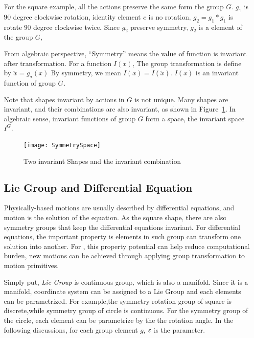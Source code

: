 For the square example, all the actions preserve the same form the group $G$.
$g_1$ is  $90$ degree clockwise rotation, identity element $e$ is no rotation,
$g_2=g_1*g_1$ is rotate $90$ degree clockwise twice.
Since $g_2$ preserve symmetry, $g_2$ is a element of the group $G$, 


From algebraic perspective, ``Symmetry'' means the value of function is invariant after transformation.
For a function $I(x)$,
The group transformation is define by $\tilde{x}=g_a(x)$
By symmetry, we mean $I(x)=I(\tilde{x})$.
$I(x)$ is an invariant function of group $G$.


Note that  shapes invariant by actions in $G$ is not unique.
Many shapes are invariant, and their combinations are also invariant, as shown in Figure~\ref{fig:SymmetrySpace}. 
In algebraic sense,  invariant functions of group $G$ form a space, the invariant space $I^G$.


\begin{figure}[!htbp]
  \begin{center}
    \texttt{[image: SymmetrySpace]}
    \caption{Two invariant Shapes and the invariant combination}
    \label{fig:SymmetrySpace}
\end{center}
\end{figure}

\subsection{Lie Group and Differential Equation}
Physically-based motions are usually described by differential equations, and motion is the solution of the equation.
As the square shape, there are also symmetry groups that keep the differential equations invariant.
For differential equations, the important property is elements in such group can transform one solution into another\citep{olver1986applications}.
For \cms, this property potential can help reduce computational burden, new motions can be achieved through applying group transformation to motion primitives.




Simply put, \emph{Lie Group} is continuous group, which is also a manifold.
Since it is a manifold, coordinate system can be assigned to a Lie Group and each elements can be parametrized.
For example,the symmetry rotation group of square is discrete,while symmetry group of circle is continuous.
For the symmetry group of the circle, each element can be parametrize by the the rotation angle.
In the following discussions, for each group element $g$, $\varepsilon$ is the parameter.

